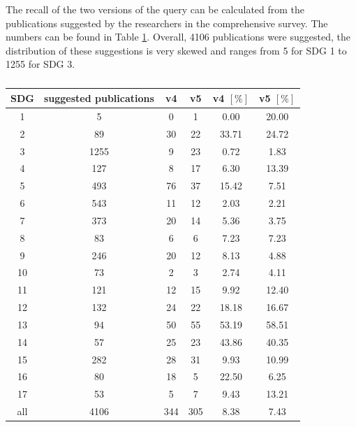 \documentclass{article}
\begin{document}
The recall of the two versions of the query can be calculated from the publications suggested by the researchers in the comprehensive survey. The numbers can be found in Table \ref{recalltable}. Overall, 4106 publications were suggested, the distribution of these suggestions is very skewed and ranges from 5 for SDG 1 to 1255 for SDG 3.
\begin{table}[H]
\centering 
 \begin{tabular}{cccccc}
 \toprule
  SDG & suggested publications & v4 & v5 & v4 $[\%]$ & v5 $[\%]$ \\
  \hline
 1 & 5 & 0 & 1 & 0.00 & 20.00 \\
 2 & 89 & 30 & 22 & 33.71 & 24.72 \\
 3 & 1255 & 9 & 23 & 0.72 & 1.83 \\
 4 & 127 & 8 & 17 & 6.30 & 13.39 \\
 5 & 493 & 76 & 37 & 15.42 & 7.51 \\
 6 & 543 & 11 & 12 & 2.03 & 2.21 \\
 7 & 373 & 20 & 14 & 5.36 & 3.75 \\
 8 & 83 & 6 & 6 & 7.23 & 7.23 \\
 9 & 246 & 20 & 12 & 8.13 & 4.88 \\
 10 & 73 & 2 & 3 & 2.74 & 4.11 \\
 11 & 121 & 12 & 15 & 9.92 & 12.40 \\
 12 & 132 & 24 & 22 & 18.18 & 16.67 \\
 13 & 94 & 50 & 55 & 53.19 & 58.51 \\
 14 & 57 & 25 & 23 & 43.86 & 40.35 \\
 15 & 282 & 28 & 31 & 9.93 & 10.99 \\
 16 & 80 & 18 & 5 & 22.50 & 6.25 \\
 17 & 53 & 5 & 7 & 9.43 & 13.21 \\
 all & 4106 & 344 & 305 & 8.38 & 7.43 \\
 \bottomrule
\end{tabular}
\caption{
}
\label{recalltable}
\end{table}
\end{document}
